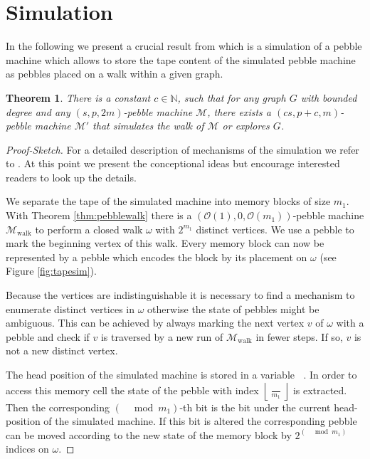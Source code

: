 \documentclass[oneside]{scrartcl}
\newtheorem{thm}{Theorem}
\DeclareMathOperator{\Thead}{T_{\text{head}}}
\begin{document}
\section{Simulation}
In the following we present a crucial result from
\cite{pebbles} which is a simulation of a pebble machine which allows to store
the tape content of the simulated pebble machine as pebbles placed on a
walk within a given graph.
\begin{thm}
  \label{thm:simulation}
  There is a constant $c\in\mathbb{N}$, such that for any graph $G$ with
  bounded degree and any $(s,p,2m)$-pebble machine $\mathcal{M}$, there
  exists a $(cs,p+c,m)$-pebble machine $\mathcal{M}'$ that simulates the
  walk of $\mathcal{M}$ or explores $G$.
\end{thm}
\begin{proof}[Proof-Sketch]
  For a detailed description of mechanisms of the simulation we refer to
  \cite{pebbles}. At this point we present the conceptional ideas but encourage
  interested readers to look up the details.
  
  We separate the tape of the simulated machine into memory blocks of size
  $m_1$. With Theorem \ref{thm:pebblewalk} there is a
  $(\mathcal{O}(1),0,\mathcal{O}(m_{1}))$-pebble machine
  $\mathcal{M}_{\text{walk}}$ to perform a closed walk $\omega$ with
  $2^{m_{1}}$ distinct vertices. We use a pebble to mark the beginning vertex
  of this walk. Every memory block can now be represented by
  a pebble which encodes the block by its placement on $\omega$ (see
  Figure \ref{fig:tapesim}).

  Because the vertices are indistinguishable it is necessary to find a
  mechanism to enumerate distinct vertices in $\omega$ otherwise the state of
  pebbles might be ambiguous. This can be achieved by always marking the next
  vertex $v$ of $\omega$ with a pebble and check if $v$ is
  traversed by a new run of $\mathcal{M}_{\text{walk}}$ in fewer steps. If so,
  $v$ is not a new distinct vertex.

  The head position of the simulated machine is stored in a variable $\Thead$.
  In order to access this memory cell the state of the pebble with index
  $\left\lfloor \frac{\Thead}{m_{1}}\right\rfloor$ is extracted. Then the
  corresponding $(\Thead\mod m_{1})$-th bit is the bit under the current
  head-position of the simulated machine. If this bit is
  altered the corresponding pebble can be moved according to the new state of
  the memory block by $2^{(\Thead\mod m_{1})}$ indices on $\omega$.


\end{proof}
\end{document}
